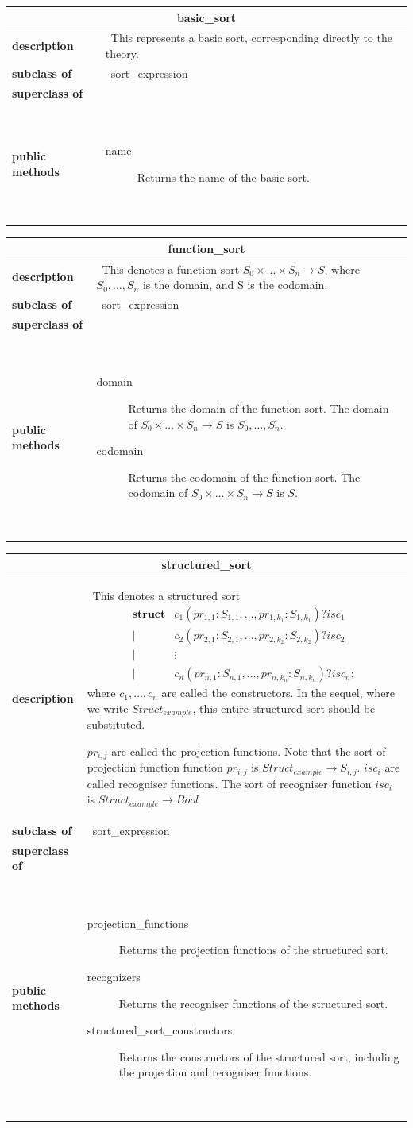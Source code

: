 \documentclass[a4paper,11pt]{article}
\newcommand{\dataclass}[5]{
\begin{flushleft}
\begin{longtable}{p{3cm} p{11cm}}
\multicolumn{2}{c}{\textbf{#1}}\\\hline\hline
\textbf{description} & ~#2~ \\\hline
\textbf{subclass of} & ~#3~ \\\hline
\textbf{superclass of} & ~#4~ \\\hline
\textbf{public methods} & ~#5~ \\\hline
\end{longtable}
\end{flushleft}
}
\begin{document}
\dataclass
  {basic\_sort}
  {This represents a basic sort, corresponding directly to the theory.}
  {sort\_expression}
  {}
  {\begin{description}
    \item[name] Returns the name of the basic sort.
   \end{description}}


\dataclass
  {function\_sort}
  {This denotes a function sort $S_0 \times ... \times S_n \rightarrow S$, where $S_0, \dots, S_n$ is the domain, and S is the codomain.}
  {sort\_expression}
  {}
  {\begin{description}
    \item[domain] Returns the domain of the function sort. The domain of $S_0 \times \dots \times S_n \rightarrow S$ is $S_0, \dots, S_n$.
    \item[codomain] Returns the codomain of the function sort. The codomain of $S_0 \times \dots \times S_n \rightarrow S$ is $S$.
   \end{description}}


\dataclass
  {structured\_sort}
  {This denotes a structured sort
   \begin{eqnarray*}
     \textbf{struct} & c_1(pr_{1,1}:S_{1,1}, \dots, pr_{1,k_1}:S_{1,k_1})?isc_1\\
                 \mid & c_2(pr_{2,1}:S_{2,1}, \dots, pr_{2,k_2}:S_{2,k_2})?isc_2\\
                 \mid & \vdots\\
                 \mid & c_n(pr_{n,1}:S_{n,1}, \dots, pr_{n,k_n}:S_{n,k_n})?isc_n;
    \end{eqnarray*}
    where $c_1, \dots, c_n$ are called the constructors. In the sequel, where we write $Struct_{example}$, this entire structured sort should be substituted.

    $pr_{i,j}$ are called the projection functions. Note that the sort of projection function function $pr_{i,j}$ is $Struct_{example} \rightarrow S_{i,j}$. $isc_i$ are called recogniser functions. The sort of recogniser function $isc_i$ is $Struct_{example} \rightarrow Bool$}
  {sort\_expression}
  {}
  {\begin{description}
    \item[projection\_functions] Returns the projection functions of the structured sort.
    \item[recognizers] Returns the recogniser functions of the structured sort.
    \item[structured\_sort\_constructors] Returns the constructors of the structured sort, including the projection and recogniser functions.
   \end{description}}
\end{document}
